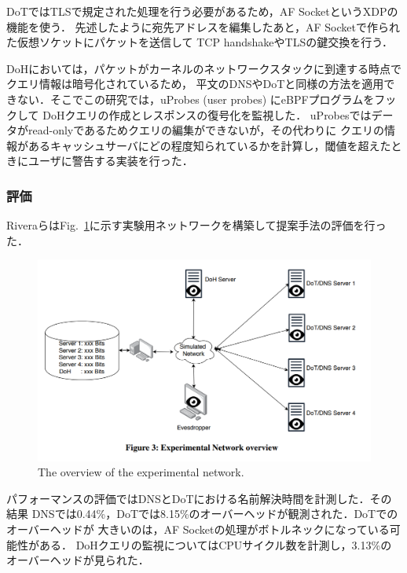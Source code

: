 \documentclass[platex,a4j,10pt,twoside,twocolumn,dvipdfmx]{jsarticle}
\newcommand{\Fref}[1]{Fig.~\ref{#1}}
\begin{document}
  DoTではTLSで規定された処理を行う必要があるため，AF SocketというXDPの機能を使う．
  先述したように宛先アドレスを編集したあと，AF Socketで作られた仮想ソケットにパケットを送信して
  TCP handshakeやTLSの鍵交換を行う．
  
  DoHにおいては，パケットがカーネルのネットワークスタックに到達する時点でクエリ情報は暗号化されているため，
  平文のDNSやDoTと同様の方法を適用できない．そこでこの研究では，uProbes (user probes) にeBPFプログラムをフックして
  DoHクエリの作成とレスポンスの復号化を監視した．
  uProbesではデータがread-onlyであるためクエリの編集ができないが，その代わりに
  クエリの情報があるキャッシュサーバにどの程度知られているかを計算し，閾値を超えたときにユーザに警告する実装を行った．
  
  \subsubsection{評価}
    Riveraらは\Fref{img:dns-net}に示す実験用ネットワークを構築して提案手法の評価を行った．
    \begin{figure}[tp]
      \begin{center}
        \includegraphics[width=\columnwidth]{./img/dns-eval-net.png}
      \end{center}
      \caption{The overview of the experimental network.}
      \label{img:dns-net}
    \end{figure}
    
    パフォーマンスの評価ではDNSとDoTにおける名前解決時間を計測した．その結果
    DNSでは0.44\%，DoTでは8.15\%のオーバーヘッドが観測された．DoTでのオーバーヘッドが
    大きいのは，AF Socketの処理がボトルネックになっている可能性がある．
    DoHクエリの監視についてはCPUサイクル数を計測し，3.13\%のオーバーヘッドが見られた．
    
\end{document}

